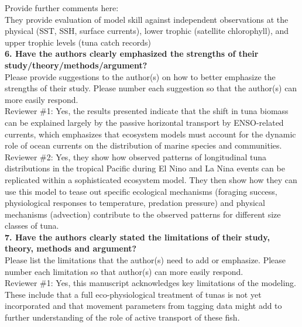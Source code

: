 \documentclass[12pt]{article}
\begin{document}
Provide further comments here:\\ 

They provide evaluation of model skill against independent observations at the physical (SST, SSH, surface currents), lower trophic (satellite chlorophyll), and upper trophic levels (tuna catch records) \\

\textbf{6. Have the authors clearly emphasized the strengths of their study/theory/methods/argument?}\\

Please provide suggestions to the author(s) on how to better emphasize the strengths of their study. Please number each suggestion so that the author(s) can more easily respond. \\

Reviewer \#1: Yes, the results presented indicate that the shift in tuna biomass can be explained largely by the passive horizontal transport by ENSO-related currents, which emphasizes that ecosystem models must account for the dynamic role of ocean currents on the distribution of marine species and communities.\\

Reviewer \#2: Yes, they show how observed patterns of longitudinal tuna distributions in the tropical Pacific during El Nino and La Nina events can be replicated within a sophisticated ecosystem model. They then show how they can use this model to tease out specific ecological mechanisms (foraging success, physiological responses to temperature, predation pressure) and physical mechanisms (advection) contribute to the observed patterns for different size classes of tuna.\\

\textbf{7. Have the authors clearly stated the limitations of their study, theory, methods and argument?}\\

Please list the limitations that the author(s) need to add or emphasize. Please number each limitation so that author(s) can more easily respond.\\

Reviewer \#1: Yes, this manuscript acknowledges key limitations of the modeling. These include that a full eco-physiological treatment of tunas is not yet incorporated and that movement parameters from tagging data might add to further understanding of the role of active transport of these fish.\\
\end{document}
